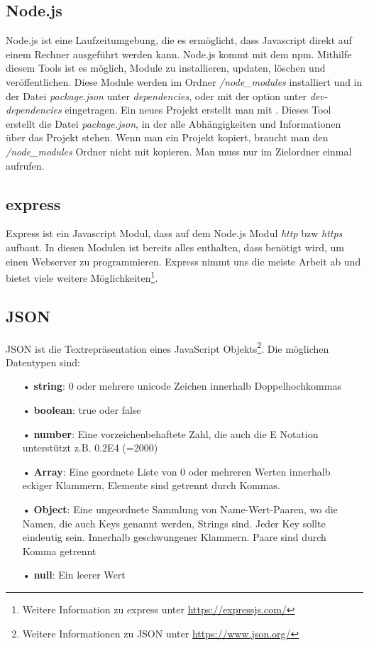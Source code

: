 \subsection{Node.js}
\label{sec:vor-node}
Node.js ist eine Laufzeitumgebung, die es ermöglicht, dass Javascript direkt auf einem Rechner ausgeführt werden kann. Node.js kommt mit dem \ac{npm}. Mithilfe diesem Tools ist es möglich, Module zu installieren, updaten, löschen und veröffentlichen. Diese Module werden im Ordner \textit{/node\_modules} installiert und in der Datei \textit{package.json} unter \textit{dependencies}, oder mit der option  unter \textit{dev-dependencies} eingetragen. Ein neues Projekt erstellt man mit . Dieses Tool erstellt die Datei \textit{package.json}, in der alle Abhängigkeiten und Informationen über das Projekt stehen. Wenn man ein Projekt kopiert, braucht man den \textit{/node\_modules} Ordner nicht mit kopieren. Man muss nur im Zielordner einmal  aufrufen.

\subsection{express}
\label{sec:vor-express}
Express ist ein Javascript Modul, dass auf dem Node.js Modul \textit{http} bzw \textit{https} aufbaut. In diesen Modulen ist bereits alles enthalten, dass benötigt wird, um einen Webserver zu programmieren. Express nimmt uns die meiste Arbeit ab und bietet viele weitere Möglichkeiten\footnote{Weitere Information zu express unter \url{https://expressjs.com/}}.

\subsection{JSON}
\label{sec:vor-json}
\ac{JSON} ist die Textrepräsentation eines JavaScript Objekts\footnote{Weitere Informationen zu \ac{JSON} unter \url{https://www.json.org/}}. Die möglichen Datentypen sind:

\begin{itemize}
\item[•] \textbf{string}: 0 oder mehrere unicode Zeichen innerhalb Doppelhochkommas
\item[•] \textbf{boolean}: true oder false
\item[•] \textbf{number}: Eine vorzeichenbehaftete Zahl, die auch die E Notation unterstützt z.B. 0.2E4 (=2000)
\item[•] \textbf{Array}: Eine geordnete Liste von 0 oder mehreren Werten innerhalb eckiger Klammern, Elemente sind getrennt durch Kommas.
\item[•] \textbf{Object}: Eine ungeordnete Sammlung von Name-Wert-Paaren, wo die Namen, die auch Keys genannt werden, Strings sind. Jeder Key sollte eindeutig sein. Innerhalb geschwungener Klammern. Paare sind durch Komma getrennt
\item[•] \textbf{null}: Ein leerer Wert
\end{itemize}

